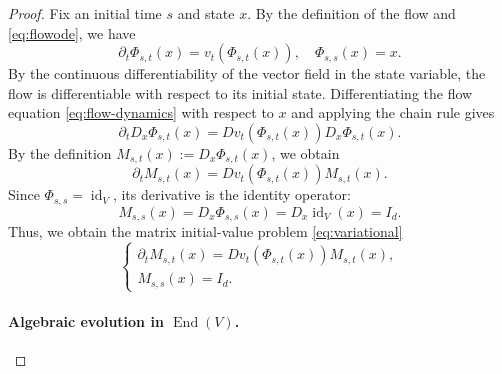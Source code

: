 \documentclass[12pt,a4paper,oneside]{book}
\begin{document}
\begin{proof}
Fix an initial time $s$ and state $x$. By the definition of the flow and \eqref{eq:flowode}, we have
\begin{equation}
    \partial_t\Phi_{s,t}(x) = v_t(\Phi_{s,t}(x)), \quad \Phi_{s,s}(x)=x.
    \label{eq:flow-dynamics}
\end{equation}
By the continuous differentiability of the vector field in the state variable, the flow is differentiable with respect to
its initial state. Differentiating the flow equation \eqref{eq:flow-dynamics} with respect to $x$ and applying the chain
rule gives
\begin{equation*}
    \partial_t D_x\Phi_{s,t}(x) = Dv_t(\Phi_{s,t}(x))D_x\Phi_{s,t}(x).
\end{equation*}
By the definition $M_{s,t}(x):=D_x\Phi_{s,t}(x)$, we obtain
\begin{equation*}
    \partial_t M_{s,t}(x) = Dv_t(\Phi_{s,t}(x))M_{s,t}(x).
\end{equation*}
Since $\Phi_{s,s}=\operatorname{id}_V$, its derivative is the identity operator:
\begin{equation*}
    M_{s,s}(x) = D_x\Phi_{s,s}(x) = D_x\operatorname{id}_V(x) = I_d.
\end{equation*}
Thus, we obtain the matrix initial-value problem \eqref{eq:variational}
\begin{equation*}
    \begin{cases}
        \partial_t M_{s,t}(x) = Dv_t(\Phi_{s,t}(x))M_{s,t}(x),\\
        M_{s,s}(x)=I_d.
    \end{cases}
\end{equation*}

\paragraph{Algebraic evolution in $\operatorname{End}(V)$.}


\end{proof}
\end{document}
